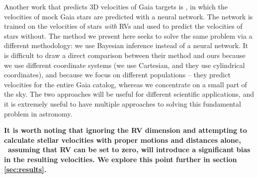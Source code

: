 Another work that predicts 3D velocities of Gaia targets is
\citet{dropulic2021}, in which the velocities of mock Gaia stars are predicted
with a neural network.
The network is trained on the velocities of stars {\it with} RVs and used to
predict the velocities of stars without.
The method we present here seeks to solve the same problem via a different
methodology: we use Bayesian inference instead of a neural network.
It is difficult to draw a direct comparison between their method and ours
because we use different coordinate systems (we use Cartesian, and they use
cylindrical coordinates), and because we focus on different populations --
they predict velocities for the entire Gaia catalog, whereas we concentrate on
a small part of the sky.
The two approaches will be useful for different scientific applications, and
it is extremely useful to have multiple approaches to solving this fundamental
problem in astronomy.

{\bf
It is worth noting that ignoring the RV dimension and attempting to
calculate stellar velocities with proper motions and distances alone, \ie\
assuming that RV can be set to zero, will introduce a significant bias in the
resulting velocities.
We explore this point further in section \ref{sec:results}.
}



